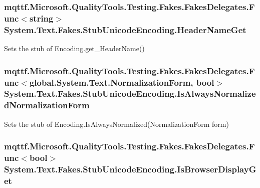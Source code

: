\hypertarget{class_system_1_1_text_1_1_fakes_1_1_stub_unicode_encoding_a9dd9396a21fd297a9ad3e0239ad62adc}{
\subsubsection[{Header\-Name\-Get}]{\setlength{\rightskip}{0pt plus 5cm}mqttf.\-Microsoft.\-Quality\-Tools.\-Testing.\-Fakes.\-Fakes\-Delegates.\-Func$<$string$>$ System.\-Text.\-Fakes.\-Stub\-Unicode\-Encoding.\-Header\-Name\-Get}}\label{class_system_1_1_text_1_1_fakes_1_1_stub_unicode_encoding_a9dd9396a21fd297a9ad3e0239ad62adc}


Sets the stub of Encoding.\-get\-\_\-\-Header\-Name()

\hypertarget{class_system_1_1_text_1_1_fakes_1_1_stub_unicode_encoding_a96f99ab89f57cb78afaa1f51977bfdb8}{
\subsubsection[{Is\-Always\-Normalized\-Normalization\-Form}]{\setlength{\rightskip}{0pt plus 5cm}mqttf.\-Microsoft.\-Quality\-Tools.\-Testing.\-Fakes.\-Fakes\-Delegates.\-Func$<$global.\-System.\-Text.\-Normalization\-Form, bool$>$ System.\-Text.\-Fakes.\-Stub\-Unicode\-Encoding.\-Is\-Always\-Normalized\-Normalization\-Form}}\label{class_system_1_1_text_1_1_fakes_1_1_stub_unicode_encoding_a96f99ab89f57cb78afaa1f51977bfdb8}


Sets the stub of Encoding.\-Is\-Always\-Normalized(\-Normalization\-Form form)

\hypertarget{class_system_1_1_text_1_1_fakes_1_1_stub_unicode_encoding_a235050e6173c5302b415048da05db192}{
\subsubsection[{Is\-Browser\-Display\-Get}]{\setlength{\rightskip}{0pt plus 5cm}mqttf.\-Microsoft.\-Quality\-Tools.\-Testing.\-Fakes.\-Fakes\-Delegates.\-Func$<$bool$>$ System.\-Text.\-Fakes.\-Stub\-Unicode\-Encoding.\-Is\-Browser\-Display\-Get}}\label{class_system_1_1_text_1_1_fakes_1_1_stub_unicode_encoding_a235050e6173c5302b415048da05db192}


